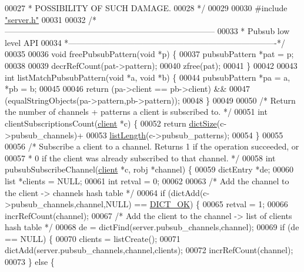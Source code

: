 \begin{DoxyCode}
00027 \textcolor{comment}{ * POSSIBILITY OF SUCH DAMAGE.}
00028 \textcolor{comment}{ */}
00029 
00030 \textcolor{preprocessor}{#}\textcolor{preprocessor}{include} \hyperlink{server_8h}{"server.h"}
00031 
00032 \textcolor{comment}{/*-----------------------------------------------------------------------------}
00033 \textcolor{comment}{ * Pubsub low level API}
00034 \textcolor{comment}{ *----------------------------------------------------------------------------*/}
00035 
00036 \textcolor{keywordtype}{void} freePubsubPattern(\textcolor{keywordtype}{void} *p) \{
00037     pubsubPattern *pat = p;
00038 
00039     decrRefCount(pat->pattern);
00040     zfree(pat);
00041 \}
00042 
00043 \textcolor{keywordtype}{int} listMatchPubsubPattern(\textcolor{keywordtype}{void} *a, \textcolor{keywordtype}{void} *b) \{
00044     pubsubPattern *pa = a, *pb = b;
00045 
00046     \textcolor{keywordflow}{return} (pa->client == pb->client) &&
00047            (equalStringObjects(pa->pattern,pb->pattern));
00048 \}
00049 
00050 \textcolor{comment}{/* Return the number of channels + patterns a client is subscribed to. */}
00051 \textcolor{keywordtype}{int} clientSubscriptionsCount(\hyperlink{structclient}{client} *c) \{
00052     \textcolor{keywordflow}{return} \hyperlink{dict_8h_af193430dd3d5579a52b194512f72c1f0}{dictSize}(c->pubsub\_channels)+
00053            \hyperlink{adlist_8h_afde0ab079f934670e82119b43120e94b}{listLength}(c->pubsub\_patterns);
00054 \}
00055 
00056 \textcolor{comment}{/* Subscribe a client to a channel. Returns 1 if the operation succeeded, or}
00057 \textcolor{comment}{ * 0 if the client was already subscribed to that channel. */}
00058 \textcolor{keywordtype}{int} pubsubSubscribeChannel(\hyperlink{structclient}{client} *c, robj *channel) \{
00059     dictEntry *de;
00060     list *clients = NULL;
00061     \textcolor{keywordtype}{int} retval = 0;
00062 
00063     \textcolor{comment}{/* Add the channel to the client -> channels hash table */}
00064     \textcolor{keywordflow}{if} (dictAdd(c->pubsub\_channels,channel,NULL) == \hyperlink{dict_8h_a2afecbeab8f7efbc183048f52f6d17e5}{DICT\_OK}) \{
00065         retval = 1;
00066         incrRefCount(channel);
00067         \textcolor{comment}{/* Add the client to the channel -> list of clients hash table */}
00068         de = dictFind(server.pubsub\_channels,channel);
00069         \textcolor{keywordflow}{if} (de == NULL) \{
00070             clients = listCreate();
00071             dictAdd(server.pubsub\_channels,channel,clients);
00072             incrRefCount(channel);
00073         \} \textcolor{keywordflow}{else} \{

\end{DoxyCode}

